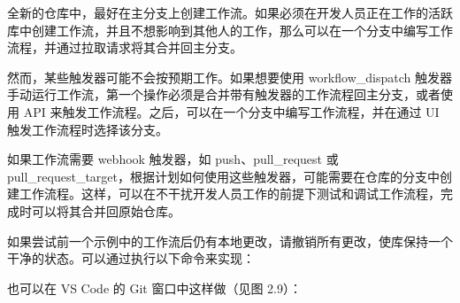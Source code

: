
全新的仓库中，最好在主分支上创建工作流。如果必须在开发人员正在工作的活跃库中创建工作流，并且不想影响到其他人的工作，那么可以在一个分支中编写工作流程，并通过拉取请求将其合并回主分支。

然而，某些触发器可能不会按预期工作。如果想要使用 workflow\_dispatch 触发器手动运行工作流，第一个操作必须是合并带有触发器的工作流程回主分支，或者使用 API 来触发工作流程。之后，可以在一个分支中编写工作流程，并在通过 UI 触发工作流程时选择该分支。

如果工作流需要 webhook 触发器，如 push、pull\_request 或 pull\_request\_target，根据计划如何使用这些触发器，可能需要在仓库的分支中创建工作流程。这样，可以在不干扰开发人员工作的前提下测试和调试工作流程，完成时可以将其合并回原始仓库。


如果尝试前一个示例中的工作流后仍有本地更改，请撤销所有更改，使库保持一个干净的状态。可以通过执行以下命令来实现：


也可以在 VS Code 的 Git 窗口中这样做（见图 2.9）：



